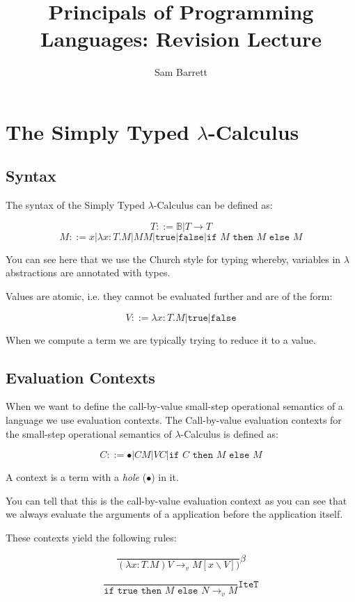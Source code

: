 \documentclass{article}
\title{Principals of Programming Languages: Revision Lecture}
\author{Sam Barrett}
\newcommand{\rarr}{\rightarrow}
\begin{document}
\maketitle
\section{The Simply Typed $\lambda$-Calculus}
\subsection{Syntax}
The syntax of the Simply Typed $\lambda$-Calculus can be defined as:

$$
T ::= \mathbb{B} | T \rightarrow T 
$$
$$
M ::= x | \lambda x: T.M | M M | \texttt{true} | \texttt{false} | \texttt{if } M \texttt{ then } M \texttt{ else } M
$$

You can see here that we use the Church style for typing whereby, variables in $\lambda$ abstractions are annotated with types.

Values are atomic, i.e. they cannot be evaluated further and are of the form:

$$
V ::= \lambda x: T.M | \texttt{true} | \texttt{false}
$$

When we compute a term we are typically trying to reduce it to a value.

\subsection{Evaluation Contexts}
When we want to define the call-by-value small-step operational semantics of a language we use evaluation contexts. The Call-by-value evaluation contexts for the small-step operational semantics of $\lambda$-Calculus is defined as:

$$
C ::= \bullet | C M | V C | \texttt{if } C \texttt{ then } M \texttt{ else } M 
$$

A context is a term with a \textit{hole} ($\bullet$) in it. 

You can tell that this is the call-by-value evaluation context as you can see that we always evaluate the arguments of a application before the application itself.

These contexts yield the following rules:

$$
\frac{}{( \lambda x: T. M) V \rarr_v M[x\backslash V])}\beta
$$

$$
\frac{}{ \texttt{if true}  \texttt{ then } M \texttt{ else } N \rarr_v M } \texttt{IteT}
$$
\end{document}
